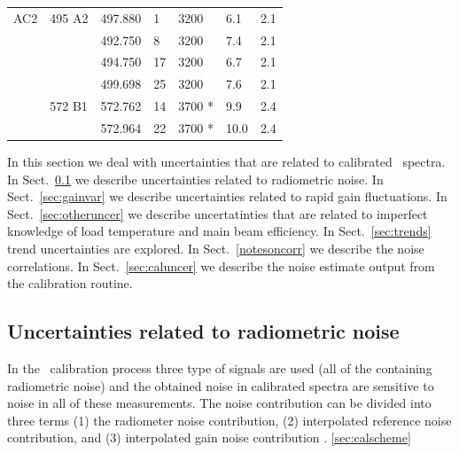 \begin{table}
\begin{tabular}{|l|l|l|l|l|l|l|}
  \hline
  AC2           & 495 A2               & 497.880                   & 1            & 3200                  & 6.1 & 2.1\\
  \cline{3-3}
  \cline{4-4}
  \cline{5-5}
  \cline{6-6}
  \cline{7-7}
                &                      & 492.750                   & 8            & 3200                  & 7.4 & 2.1\\
  \cline{3-3}
  \cline{4-4}
  \cline{5-5}
  \cline{6-6}
  \cline{7-7}
                &                      & 494.750                   & 17           & 3200                  & 6.7 & 2.1\\
  \cline{3-3}
  \cline{4-4}
  \cline{5-5}
  \cline{6-6}
  \cline{7-7}
                &                      & 499.698                   & 25           & 3200                 & 7.6 & 2.1\\
  \cline{2-2}
  \cline{3-3}
  \cline{4-4}
  \cline{5-5}
  \cline{6-6}
  \cline{7-7}
                & 572 B1              & 572.762                    & 14           & 3700 *              & 9.9 & 2.4\\
  \cline{3-3}
  \cline{4-4}
  \cline{5-5}
  \cline{6-6}
  \cline{7-7}
                &                     & 572.964                    & 22           & 3700 *              & 10.0 & 2.4\\
  \hline
\end{tabular}
\end{table}

In this section we deal with uncertainties that are related to calibrated \smr\ spectra. 
In Sect.~\ref{sec:radnoise} we describe uncertainties related to radiometric noise.
In Sect.~\ref{sec:gainvar} we describe uncertainties related to rapid gain fluctuations.
In Sect.~\ref{sec:otheruncer} we describe uncertatinties that are related to imperfect knowledge
of load temperature and main beam efficiency.
In Sect.~\ref{sec:trends} trend uncertainties are explored.
In Sect.~\ref{notesoncorr} we describe the noise correlations. 
In Sect.~\ref{sec:caluncer} we describe the noise estimate output from the calibration routine.  


\subsection{Uncertainties related to radiometric noise}
\label{sec:radnoise}

In the \smr\ calibration process three type of signals are used (all of the containing radiometric noise)
and the obtained noise in calibrated spectra are sensitive to noise in
all of these measurements. 
The noise contribution can be divided into three terms
(1) the radiometer noise contribution,
(2) interpolated reference noise contribution, and (3) interpolated gain noise contribution
\cite{jarnot:04}.
\ref{sec:calscheme}

